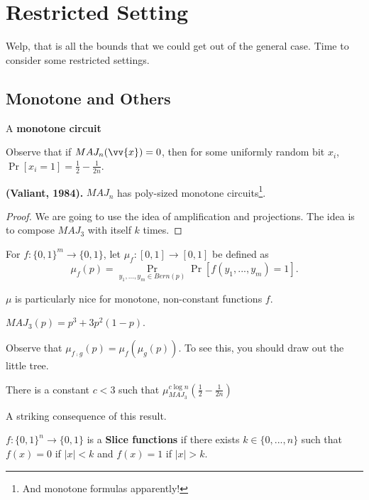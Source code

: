 \section{Restricted Setting}
Welp, that is all the bounds that we could get out of the general case. Time to consider some restricted settings.

\subsection{Monotone and Others}
\begin{definition}
	A \textbf{monotone circuit}
\end{definition}

Observe that if $MAJ_n(\vv{x}) = 0$, then for some uniformly random bit $x_i$, $\Pr[x_i = 1] = \frac{1}{2} - \frac{1}{2n}$.
\begin{theorem}
	\textbf{(Valiant, 1984).} $MAJ_n$ has poly-sized monotone circuits\footnote{And monotone formulas apparently!}.
\end{theorem}
\begin{proof}
	We are going to use the idea of amplification and projections. The idea is to compose $MAJ_3$ with itself $k$ times. 
\end{proof}

\begin{definition}
	For $f: \{0,1\}^m \rightarrow \{0,1\}$, let $\mu_f: [0,1] \rightarrow [0,1]$ be defined as
	\[\mu_f(p) = \Pr_{y_1, ..., y_m \in Bern(p)}\Pr[f(y_1, ..., y_m) = 1].\]
\end{definition}
$\mu$ is particularly nice for monotone, non-constant functions $f$. 

\begin{example}
	$MAJ_3(p) = p^3 + 3p^2(1-p)$.
\end{example}
Observe that $\mu_{f \comp g}(p) = \mu_f(\mu_g(p))$. To see this, you should draw out the little tree. 

\begin{lemma}
	There is a constant $c < 3$ such that $\mu_{MAJ_3}^{c\log n}\left(\frac{1}{2} - \frac{1}{2n}\right)$
\end{lemma}

A striking consequence of this result.
\begin{definition}
	$f: \{0,1\}^n \rightarrow \{0,1\}$ is a \textbf{Slice functions} if there exists $k \in \{0, ..., n\}$ such that $f(x) = 0$ if $|x| < k$ and $f(x) = 1$ if $|x| > k$.
\end{definition}

